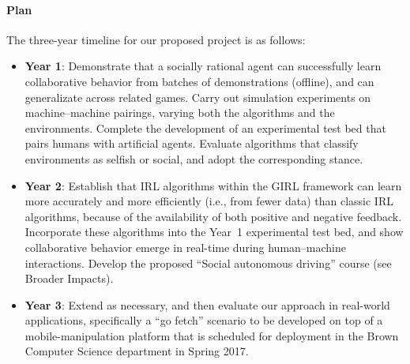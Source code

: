 
\vspace{\up}
\paragraph{Plan}

The three-year timeline for our proposed project is as follows:

\begin{itemize}
\item {\bf Year 1}: Demonstrate that a socially rational agent can
  successfully learn collaborative behavior from batches of
  demonstrations (offline), and can generalizate across related games.
  Carry out simulation experiments on machine--machine pairings,
  varying both the algorithms and the environments.  Complete the
  development of an experimental test bed that pairs humans with
  artificial agents.
%
Evaluate algorithms that classify environments as selfish or social,
and adopt the corresponding stance.


\item {\bf Year 2}: Establish that IRL algorithms within the GIRL
  framework can learn more accurately and more efficiently (i.e., from
  fewer data) than classic IRL algorithms, because of the availability
  of both positive and negative feedback.  Incorporate these
  algorithms into the Year~1 experimental test bed, and show
  collaborative behavior emerge in real-time during human--machine
  interactions.  Develop the proposed ``Social autonomous driving''
  course (see Broader Impacts).  

\item {\bf Year 3}: Extend as necessary, and then evaluate our
  approach in real-world applications, specifically a ``go fetch''
  scenario to be developed on top of a mobile-manipulation platform
  that is scheduled for deployment in the Brown Computer Science
  department in Spring 2017.


\end{itemize}

